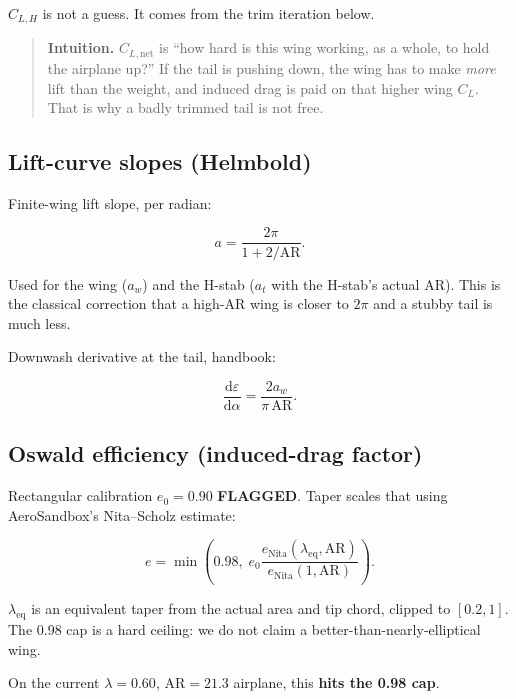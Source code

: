 \documentclass[11pt,letterpaper]{article}
\newcommand{\flag}{\textcolor{red!60!black}{\textbf{FLAGGED}}}
\newenvironment{intuition}{\begin{quote}\small}{\end{quote}}
\begin{document}
$C_{L,H}$ is not a guess. It comes from the trim iteration below.

\begin{intuition}
\textbf{Intuition.} $C_{L,\mathrm{net}}$ is ``how hard is this wing working, as a whole, to hold the airplane up?'' If the tail is pushing down, the wing has to make \emph{more} lift than the weight, and induced drag is paid on that higher wing $C_L$. That is why a badly trimmed tail is not free.
\end{intuition}

\subsection{Lift-curve slopes (Helmbold)}

Finite-wing lift slope, per radian:

\begin{equation}
  a = \frac{2\pi}{1 + 2/\mathrm{AR}}.
\label{eq:helmbold}
\end{equation}

Used for the wing ($a_w$) and the H-stab ($a_t$ with the H-stab's actual AR). This is the classical correction that a high-AR wing is closer to $2\pi$ and a stubby tail is much less.

Downwash derivative at the tail, handbook:

\begin{equation}
  \frac{\mathrm{d}\varepsilon}{\mathrm{d}\alpha} = \frac{2 a_w}{\pi\,\mathrm{AR}}.
\end{equation}

\subsection{Oswald efficiency (induced-drag factor)}

Rectangular calibration $e_0 = 0.90$ \flag{}. Taper scales that using AeroSandbox's Nita--Scholz estimate:

\begin{equation}
  e = \min\left(0.98,\;
      e_0 \frac{e_\mathrm{Nita}(\lambda_\mathrm{eq},\mathrm{AR})}
               {e_\mathrm{Nita}(1,\mathrm{AR})}\right).
\end{equation}

$\lambda_\mathrm{eq}$ is an equivalent taper from the actual area and tip chord, clipped to $[0.2, 1]$. The 0.98 cap is a hard ceiling: we do not claim a better-than-nearly-elliptical wing.

On the current $\lambda = 0.60$, $\mathrm{AR} = 21.3$ airplane, this \textbf{hits the 0.98 cap}.
\end{document}
